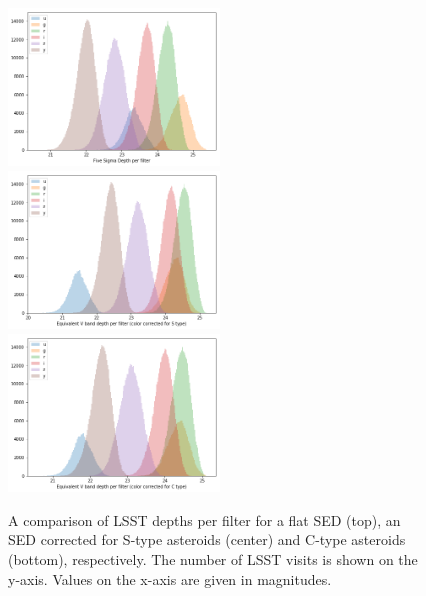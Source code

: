 \begin{figure}[tb!]
\begin{center}
\includegraphics[width=0.5\textwidth]{figs/5sig_filter.png}\\
\includegraphics[width=0.5\textwidth]{figs/5sig_filter_S.png}\\
\includegraphics[width=0.5\textwidth]{figs/5sig_filter_C.png}
\end{center}
\caption{A comparison of \gls{LSST} depths per filter for a flat \gls{SED} (top), an \gls{SED} corrected for S-type asteroids (center) and C-type asteroids (bottom), respectively. The number of \gls{LSST} visits is shown on the y-axis. Values on the x-axis are given in magnitudes.}
\label{fig:sed}       %
\end{figure}
%
%
\clearpage
